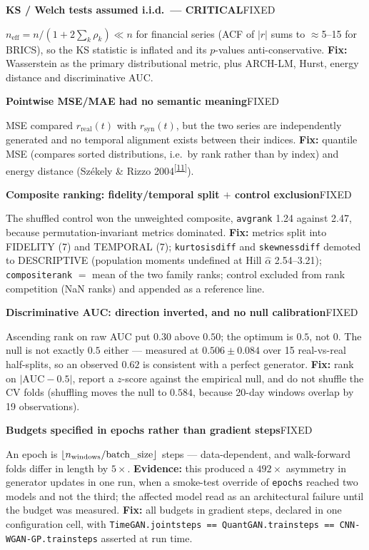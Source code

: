 \documentclass[11pt,a4paper]{article}
\makeatletter
\newcommand{\tcite}[1]{\textsuperscript{[\hyperlink{R:#1}{#1}]}}
\DeclareRobustCommand{\_}{\ifmmode\nfss@text{\textunderscore}\else\textunderscore\allowbreak\fi}
\newcommand{\auditrow}[5]{\par\medskip\noindent\textbf{#4}\hfill{\sffamily\footnotesize\textsc{#1}}\par\nopagebreak\noindent #5\par}
\makeatother
\begin{document}
\auditrow{FIXED}{DRed}{RBg}%
  {KS / Welch tests assumed i.i.d.\ --- CRITICAL}%
  {$n_\text{eff} = n/(1+2\sum_k\rho_k) \ll n$ for financial series (ACF of $|r|$ sums to $\approx$5--15 for BRICS), so the KS statistic is inflated and its $p$-values anti-conservative. \textbf{Fix:} Wasserstein as the primary distributional metric, plus ARCH-LM, Hurst, energy distance and discriminative AUC.}

\auditrow{FIXED}{DRed}{RBg}%
  {Pointwise MSE/MAE had no semantic meaning}%
  {MSE compared $r_\text{real}(t)$ with $r_\text{syn}(t)$, but the two series are independently generated and no temporal alignment exists between their indices. \textbf{Fix:} quantile MSE (compares sorted distributions, i.e.\ by rank rather than by index) and energy distance (Sz\'{e}kely \& Rizzo 2004\tcite{11}).}

\auditrow{FIXED}{Amber}{ABg}%
  {Composite ranking: fidelity/temporal split $+$ control exclusion}%
  {The shuffled control won the unweighted composite, \texttt{avg\_rank} 1.24 against 2.47, because permutation-invariant metrics dominated. \textbf{Fix:} metrics split into FIDELITY (7) and TEMPORAL (7); \texttt{kurtosis\_diff} and \texttt{skewness\_diff} demoted to DESCRIPTIVE (population moments undefined at Hill $\hat\alpha$ 2.54--3.21); \texttt{composite\_rank} $=$ mean of the two family ranks; control excluded from rank competition (NaN ranks) and appended as a reference line.}

\auditrow{FIXED}{Amber}{ABg}%
  {Discriminative AUC: direction inverted, and no null calibration}%
  {Ascending rank on raw AUC put $0.30$ above $0.50$; the optimum is $0.5$, not $0$. The null is not exactly $0.5$ either --- measured at $0.506\pm0.084$ over 15 real-vs-real half-splits, so an observed $0.62$ is consistent with a perfect generator. \textbf{Fix:} rank on $|\text{AUC}-0.5|$, report a $z$-score against the empirical null, and do not shuffle the CV folds (shuffling moves the null to $0.584$, because 20-day windows overlap by 19 observations).}

\auditrow{FIXED}{Amber}{ABg}%
  {Budgets specified in epochs rather than gradient steps}%
  {An epoch is $\lfloor n_\text{windows}/\text{batch\_size}\rfloor$ steps --- data-dependent, and walk-forward folds differ in length by $5\times$. \textbf{Evidence:} this produced a $492\times$ asymmetry in generator updates in one run, when a smoke-test override of \texttt{epochs} reached two models and not the third; the affected model read as an architectural failure until the budget was measured. \textbf{Fix:} all budgets in gradient steps, declared in one configuration cell, with \texttt{TimeGAN.joint\_steps == QuantGAN.train\_steps == CNN-WGAN-GP.train\_steps} asserted at run time.}
\end{document}
